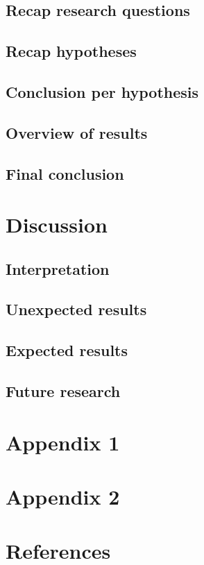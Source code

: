 \documentclass{article}
\begin{document}
 \subsection{Recap research questions}
 \subsection{Recap hypotheses}
 \subsection{Conclusion per hypothesis}
 \subsection{Overview of results}
 \subsection{Final conclusion}
 
 \section{Discussion}
 \subsection{Interpretation}
 \subsection{Unexpected results}
 \subsection{Expected results}
 \subsection{Future research}
 
 \begin{appendices}
  \section{Appendix 1}
  \section{Appendix 2}
 \end{appendices}
 
 \section*{References}
 
 {}
 
\end{document}
